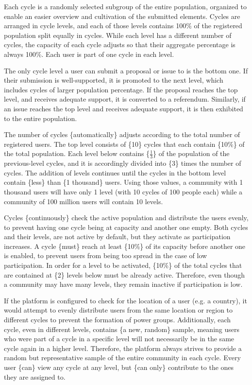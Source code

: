 \documentclass[a4paper,11pt]{article}
\begin{document}
\begin{multicols}{2}
Each cycle is a randomly selected subgroup of the entire population, organized to enable an easier overview and cultivation of the submitted elements. Cycles are arranged in cycle levels, and each of those levels contains 100\% of the registered population split equally in cycles. While each level has a different number of cycles, the capacity of each cycle adjusts so that their aggregate percentage is always 100\%. Each user is part of one cycle in each level.

The only cycle level a user can submit a proposal or issue to is the bottom one. If their submission is well-supported, it is promoted to the next level, which includes cycles of larger population percentage. If the proposal reaches the top level, and receives adequate support, it is converted to a referendum. Similarly, if an issue reaches the top level and receives adequate support, it is then exhibited to the entire population.

The number of cycles \{automatically\} adjusts according to the total number of registered users. The top level consists of \{10\} cycles that each contain \{10\%\} of the total population. Each level below contains \{$\frac{1}{3}$\} of the population of the previous-level cycles, and it is accordingly divided into \{3\} times the number of cycles. The addition of levels continues until the cycles in the bottom level contain \{less\} than \{1 thousand\} users. Using those values, a community with 1 thousand users will have only 1 level (with 10 cycles of 100 people each) while a community of 100 million users will contain 10 levels.

Cycles \{continuously\} check the active population and distribute the users evenly, to prevent having one cycle being at capacity and another one empty. Both cycles and their levels, are not active by default, but they activate as participation increases. A cycle \{must\} reach at least \{10\%\} of its capacity before another one is enabled, to prevent users from being too spread in the case of low participation. In order for a level to be activated, \{10\%\} of the total cycles that are contained at \{2\} levels below must be already active. Therefore, even though a community may have many levels, they remain inactive if participation is low.

If the platform is configured to check for the location of a user (e.g. a country), it would attempt to evenly distribute users from the same location or region to different cycles to prevent the formation of power groups. Additionally, each cycle, even in different levels, contains \{a new, random\} sample, meaning users who were part of a cycle in a specific level will not necessarily be in the same cycle again in a higher level. Therefore, the platform always strives to provide a random but representative sample of the entire community in each cycle. Every user \{can\} view any cycle at any level, but \{can only\} contribute to the ones they are assigned to.


\end{multicols}
\end{document}
